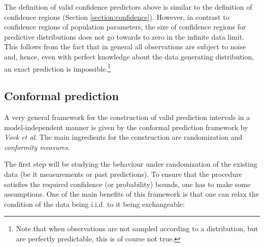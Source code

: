     \begin{remark}
        The definition of valid confidence predictors above is similar to the definition of confidence regions (Section \ref{section:confidence}). However, in contrast to confidence regions of population parameters, the size of confidence regions for predictive distributions does not go towards to zero in the infinite data limit. This follows from the fact that in general all observations are subject to noise and, hence, even with perfect knowledge about the data generating distribution, an exact prediction is impossible.\footnote{Note that when observations are not sampled according to a distribution, but are perfectly predictable, this is of course not true.}
    \end{remark}

\subsection{Conformal prediction}

    A very general framework for the construction of valid prediction intervals in a model-independent manner is given by the conformal prediction framework by \textit{Vovk et al}. The main ingredients for the construction are randomization and \textit{conformity measures}.

    The first step will be studying the behaviour under randomization of the existing data (be it measurements or past predictions). To ensure that the procedure satisfies the required confidence (or probability) bounds, one has to make some assumptions. One of the main benefits of this framework is that one can relax the condition of the data being i.i.d. to it being exchangeable:

